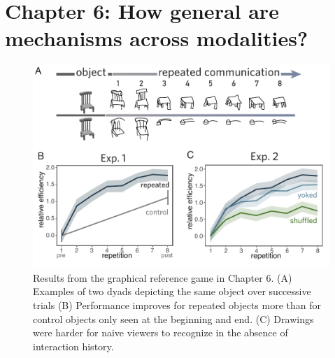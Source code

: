 \documentclass[11pt]{article}
\begin{document}


\section*{Chapter 6: How general are mechanisms across modalities?}

\begin{figure}[t]
\centering
\includegraphics[scale=0.8]{chapter6}
\caption{\small Results from the graphical reference game in Chapter 6. (A) Examples of two dyads depicting the same object over successive trials (B) Performance improves for repeated objects more than for control objects only seen at the beginning and end. (C) Drawings were harder for naive viewers to recognize in the absence of interaction history.}
\label{fig:chapter6}
\end{figure}
\end{document}
